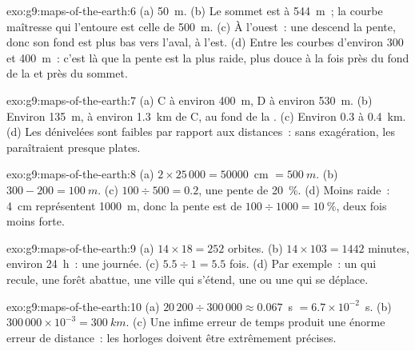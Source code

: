 \begin{solution}{exo:g9:maps-of-the-earth:6}
(a) \qty{50}{m}. (b) Le sommet est à \qty{544}{m}~; la courbe maîtresse
qui l'entoure est celle de \qty{500}{m}. (c) À l'ouest~: une 
descend la pente, donc son fond est plus bas vers l'aval, à l'est.
(d) Entre les courbes d'environ 300 et \qty{400}{m}~: c'est là que la
pente est la plus raide, plus douce à la fois près du fond de la  et
près du sommet.
\end{solution}

\begin{solution}{exo:g9:maps-of-the-earth:7}
(a) C à environ \qty{400}{m}, D à environ \qty{530}{m}. (b) Environ
\qty{135}{m}, à environ \qty{1.3}{km} de C, au fond de la .
(c) Environ 0.3 à \qty{0.4}{km}. (d) Les dénivelées sont faibles par
rapport aux distances~: sans exagération, les  paraîtraient
presque plates.
\end{solution}

\begin{solution}{exo:g9:maps-of-the-earth:8}
(a) $2 \times 25\,000 = \num{50000}$~cm $= \qty{500}{m}$. (b) $300 - 200 =
\qty{100}{m}$. (c) $100 \div 500 = 0.2$, une pente de \qty{20}{\%}. (d) Moins raide~:
\qty{4}{cm} représentent \qty{1000}{m}, donc la pente est de $100 \div 1000 = \qty{10}{\%}$,
deux fois moins forte.
\end{solution}

\begin{solution}{exo:g9:maps-of-the-earth:9}
(a) $14 \times 18 = 252$ orbites. (b) $14 \times 103 = 1442$ minutes,
environ \qty{24}{h}~: une journée. (c) $5.5 \div 1 = 5.5$ fois. (d) Par
exemple~: un  qui recule, une forêt abattue, une ville qui
s'étend, une  ou une  qui se déplace.
\end{solution}

\begin{solution}{exo:g9:maps-of-the-earth:10}
(a) $20\,200 \div 300\,000 \approx 0.067$~s $= 6.7 \times 10^{-2}$~s.
(b) $300\,000 \times 10^{-3} = \qty{300}{km}$. (c) Une infime erreur de
temps produit une énorme erreur de distance~: les horloges doivent être
extrêmement précises.
\end{solution}

